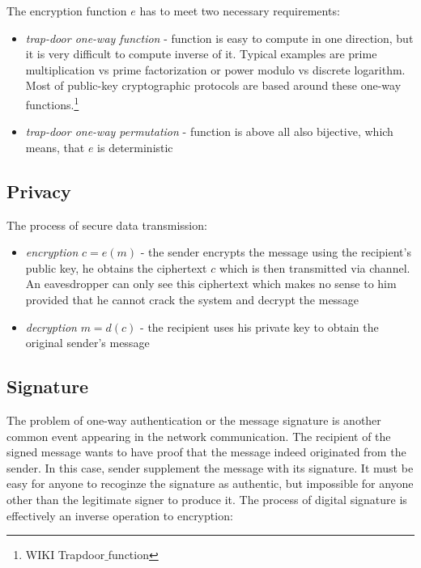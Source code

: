 The encryption function $e$ has to meet two necessary requirements:

\begin{itemize}

\item \textit{trap-door one-way function} - function is easy to compute in one direction, but it is very difficult to compute inverse of it. Typical examples are prime multiplication vs prime factorization or power modulo vs discrete logarithm. Most of public-key cryptographic protocols are based around these one-way functions.\footnote{WIKI Trapdoor$\_$function}

\item \textit{trap-door one-way permutation} - function is above all also bijective, which means, that $e$ is deterministic 

\end{itemize}

\subsection*{Privacy}

The process of secure data transmission:

\begin{itemize}

\item \textit{encryption} $c = e(m)$ - the sender encrypts the message using the recipient's public key, he obtains the ciphertext $c$ which is then transmitted via channel. An eavesdropper can only see this ciphertext which makes no sense to him provided that he cannot crack the system and decrypt the message

\item \textit{decryption} $m = d(c)$ - the recipient uses his private key to obtain the original sender's message

\end{itemize}

\subsection*{Signature}

The problem of one-way authentication or the message signature is another common event appearing in the network communication. The recipient of the signed message wants to have proof that the message indeed originated from the sender. In this case, sender supplement the message with its signature. It must be easy for anyone to recoginze the signature as authentic, but impossible for anyone other than the legitimate signer to produce it. The process of digital signature is effectively an inverse operation to encryption:

